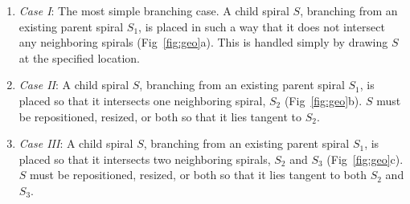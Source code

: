 \documentclass[11pt]{IEEEtran}
\begin{document}
\begin{enumerate}
\item \textit{Case I}: The most simple branching case. A child spiral \begin{math}S\end{math}, branching from an existing parent spiral \begin{math}S_{1}\end{math}, is placed in such a way that it does not intersect any neighboring spirals (Fig~\ref{fig:geo}a). This is handled simply by drawing \begin{math}S\end{math} at the specified location. 
\item \textit{Case II}: A child spiral \begin{math}S\end{math}, branching from an existing parent spiral \begin{math}S_{1}\end{math}, is placed so that it intersects one neighboring spiral, \begin{math}S_{2}\end{math} (Fig~\ref{fig:geo}b). \begin{math}S\end{math} must be repositioned, resized, or both so that it lies tangent to \begin{math}S_{2}\end{math}.
\item \textit{Case III}: A child spiral \begin{math}S\end{math}, branching from an existing parent spiral \begin{math}S_{1}\end{math}, is placed so that it intersects two neighboring spirals, \begin{math}S_{2}\end{math} and  \begin{math}S_{3}\end{math} (Fig~\ref{fig:geo}c). \begin{math}S\end{math} must be repositioned, resized, or both so that it lies tangent to both \begin{math}S_{2}\end{math} and  \begin{math}S_{3}\end{math}. 
\end{enumerate}
\end{document}
